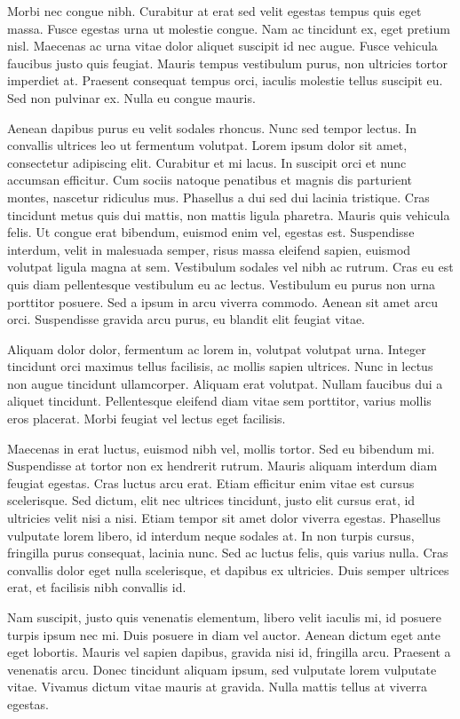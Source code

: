 Morbi nec congue nibh. Curabitur at erat sed velit egestas tempus quis eget massa. Fusce egestas urna ut molestie congue. Nam ac tincidunt ex, eget pretium nisl. Maecenas ac urna vitae dolor aliquet suscipit id nec augue. Fusce vehicula faucibus justo quis feugiat. Mauris tempus vestibulum purus, non ultricies tortor imperdiet at. Praesent consequat tempus orci, iaculis molestie tellus suscipit eu. Sed non pulvinar ex. Nulla eu congue mauris.

Aenean dapibus purus eu velit sodales rhoncus. Nunc sed tempor lectus. In convallis ultrices leo ut fermentum volutpat.
Lorem ipsum dolor sit amet, consectetur adipiscing elit. Curabitur et mi lacus. In suscipit orci et nunc accumsan efficitur. Cum sociis natoque penatibus et magnis dis parturient montes, nascetur ridiculus mus. Phasellus a dui sed dui lacinia tristique. Cras tincidunt metus quis dui mattis, non mattis ligula pharetra. Mauris quis vehicula felis. Ut congue erat bibendum, euismod enim vel, egestas est. Suspendisse interdum, velit in malesuada semper, risus massa eleifend sapien, euismod volutpat ligula magna at sem. Vestibulum sodales vel nibh ac rutrum. Cras eu est quis diam pellentesque vestibulum eu ac lectus. Vestibulum eu purus non urna porttitor posuere. Sed a ipsum in arcu viverra commodo. Aenean sit amet arcu orci. Suspendisse gravida arcu purus, eu blandit elit feugiat vitae.

Aliquam dolor dolor, fermentum ac lorem in, volutpat volutpat urna. Integer tincidunt orci maximus tellus facilisis, ac mollis sapien ultrices. Nunc in lectus non augue tincidunt ullamcorper. Aliquam erat volutpat. Nullam faucibus dui a aliquet tincidunt. Pellentesque eleifend diam vitae sem porttitor, varius mollis eros placerat. Morbi feugiat vel lectus eget facilisis.

Maecenas in erat luctus, euismod nibh vel, mollis tortor. Sed eu bibendum mi. Suspendisse at tortor non ex hendrerit rutrum. Mauris aliquam interdum diam feugiat egestas. Cras luctus arcu erat. Etiam efficitur enim vitae est cursus scelerisque. Sed dictum, elit nec ultrices tincidunt, justo elit cursus erat, id ultricies velit nisi a nisi. Etiam tempor sit amet dolor viverra egestas. Phasellus vulputate lorem libero, id interdum neque sodales at. In non turpis cursus, fringilla purus consequat, lacinia nunc. Sed ac luctus felis, quis varius nulla. Cras convallis dolor eget nulla scelerisque, et dapibus ex ultricies. Duis semper ultrices erat, et facilisis nibh convallis id.

Nam suscipit, justo quis venenatis elementum, libero velit iaculis mi, id posuere turpis ipsum nec mi. Duis posuere in diam vel auctor. Aenean dictum eget ante eget lobortis. Mauris vel sapien dapibus, gravida nisi id, fringilla arcu. Praesent a venenatis arcu. Donec tincidunt aliquam ipsum, sed vulputate lorem vulputate vitae. Vivamus dictum vitae mauris at gravida. Nulla mattis tellus at viverra egestas.

